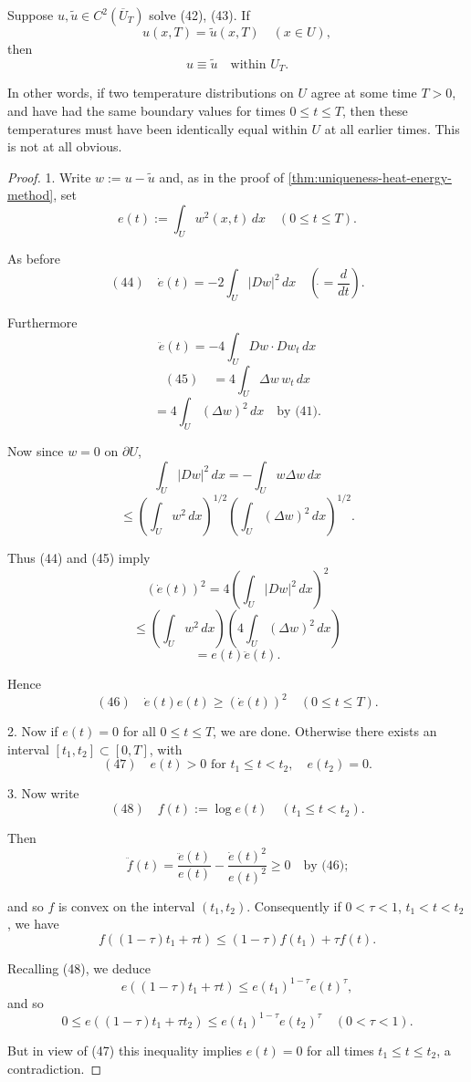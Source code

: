 \begin{theorem}
\label{thm:backwards-uniqueness-heat-equation}
Suppose $u, \tilde{u} \in C^2(\overline{U}_T)$ solve (42), (43). If
$$u(x, T) = \tilde{u}(x, T) \quad (x \in U),$$
then
$$u \equiv \tilde{u} \quad \text{within } U_T.$$
\end{theorem}

In other words, if two temperature distributions on $U$ agree at some time $T > 0$, and have had the same boundary values for times $0 \leq t \leq T$, then these temperatures must have been identically equal within $U$ at all earlier times. This is not at all obvious.

\begin{proof}
1. Write $w := u - \tilde{u}$ and, as in the proof of \cref{thm:uniqueness-heat-energy-method}, set
$$e(t) := \int_U w^2(x, t)\, dx \quad (0 \leq t \leq T).$$

As before
$$(44) \quad \dot{e}(t) = -2 \int_U |Dw|^2 \, dx \quad \left(\dot{} = \frac{d}{dt}\right).$$

Furthermore
$$\ddot{e}(t) = -4 \int_U Dw \cdot Dw_t\, dx$$
$$(45) \quad = 4 \int_U \Delta w \, w_t\, dx$$
$$= 4 \int_U (\Delta w)^2 \, dx \quad \text{by (41).}$$

Now since $w = 0$ on $\partial U$,
$$\int_U |Dw|^2 \, dx = -\int_U w \Delta w\, dx$$
$$\leq \left(\int_U w^2 \, dx\right)^{1/2} \left(\int_U (\Delta w)^2 \, dx\right)^{1/2}.$$

Thus (44) and (45) imply
$$(\dot{e}(t))^2 = 4 \left(\int_U |Dw|^2 \, dx\right)^2$$
$$\leq \left(\int_U w^2 \, dx\right) \left(4 \int_U (\Delta w)^2 \, dx\right)$$
$$= e(t)\ddot{e}(t).$$

Hence
$$(46) \quad \dot{e}(t)e(t) \geq (\dot{e}(t))^2 \quad (0 \leq t \leq T).$$

2. Now if $e(t) = 0$ for all $0 \leq t \leq T$, we are done. Otherwise there exists an interval $[t_1, t_2] \subset [0,T]$, with
$$(47) \quad e(t) > 0 \text{ for } t_1 \leq t < t_2, \quad e(t_2) = 0.$$

3. Now write
$$(48) \quad f(t) := \log e(t) \quad (t_1 \leq t < t_2).$$

Then
$$\ddot{f}(t) = \frac{\ddot{e}(t)}{e(t)} - \frac{\dot{e}(t)^2}{e(t)^2} \geq 0 \quad \text{by (46);}$$

and so $f$ is convex on the interval $(t_1, t_2)$. Consequently if $0 < \tau < 1$, $t_1 < t < t_2$, we have
$$f((1-\tau)t_1 + \tau t) \leq (1-\tau)f(t_1) + \tau f(t).$$

Recalling (48), we deduce
$$e((1-\tau)t_1 + \tau t) \leq e(t_1)^{1-\tau}e(t)^\tau,$$
and so
$$0 \leq e((1-\tau)t_1 + \tau t_2) \leq e(t_1)^{1-\tau}e(t_2)^\tau \quad (0 < \tau < 1).$$

But in view of (47) this inequality implies $e(t) = 0$ for all times $t_1 \leq t \leq t_2$, a contradiction.
\end{proof}

